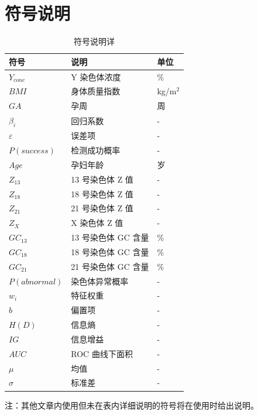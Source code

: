 \documentclass[withoutpreface,bwprint]{cumcmthesis} %
\begin{document}
\section{符号说明}
\begin{table}[H]
    \centering  %
    \caption{符号说明详}  %
    \label{tab:符号说明}  %
    \begin{threeparttable}
        \begin{tabularx}{\textwidth}{p{} p{} l}
            \toprule[1.5pt]
            \textbf{符号} & \textbf{说明} & \textbf{单位} \\ 
            \midrule[1pt]
            $Y_{conc}$ & Y 染色体浓度 & \%  \\
            $BMI$ & 身体质量指数 & kg/m$^2$\\
            $GA$ & 孕周 & 周  \\
            $\beta_i$ & 回归系数 & -  \\
            $\varepsilon$ & 误差项 & -  \\
            $P(success)$ & 检测成功概率 & -  \\
            $Age$ & 孕妇年龄 & 岁  \\
            $Z_{13}$ & 13 号染色体 Z 值 & -  \\
            $Z_{18}$ & 18 号染色体 Z 值 & -  \\
            $Z_{21}$ & 21 号染色体 Z 值 & -  \\
            $Z_X$ & X 染色体 Z 值 & -  \\
            $GC_{13}$ & 13 号染色体 GC 含量 & \%  \\
            $GC_{18}$ & 18 号染色体 GC 含量 & \%  \\
            $GC_{21}$ & 21 号染色体 GC 含量 & \%  \\
            $P(abnormal)$ & 染色体异常概率 & -  \\
            $w_i$ & 特征权重 & -  \\
            $b$ & 偏置项 & -  \\
            $H(D)$ & 信息熵 & -  \\
            $IG$ & 信息增益 & -  \\
            $AUC$ & ROC 曲线下面积 & -  \\
            $\mu$ & 均值 & -  \\
            $\sigma$ & 标准差 & -\\
            \bottomrule[1.5pt]
        
        \end{tabularx}
        \begin{tablenotes}
            \footnotesize
            \item 注：其他文章内使用但未在表内详细说明的符号将在使用时给出说明。
        \end{tablenotes}
    \end{threeparttable}
\end{table}
\end{document}

